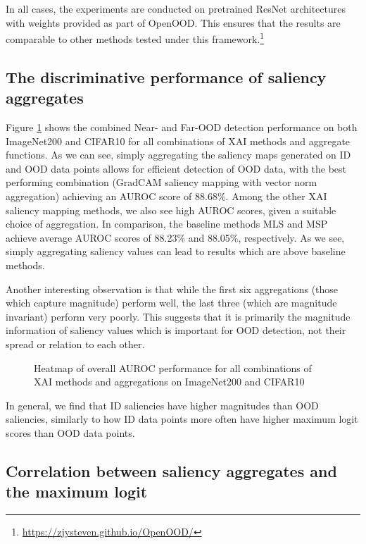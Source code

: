 \documentclass[runningheads]{llncs}
\begin{document}
In all cases, the experiments are conducted on pretrained ResNet architectures with weights provided as part of OpenOOD. This ensures that the results are comparable to other methods tested under this framework.\footnote{\url{https://zjysteven.github.io/OpenOOD/}}

\subsection{The discriminative performance of saliency aggregates}

Figure \ref{fig:both_heatmap} shows the combined Near- and Far-OOD detection performance on both ImageNet200 and CIFAR10 for all combinations of XAI methods and aggregate functions. As we can see, simply aggregating the saliency maps generated on ID and OOD data points allows for efficient detection of OOD data, with the best performing combination (GradCAM saliency mapping with vector norm aggregation) achieving an AUROC score of 88.68\%. Among the other XAI saliency mapping methods, we also see high AUROC scores, given a suitable choice of aggregation. In comparison, the baseline methods MLS and MSP achieve average AUROC scores of 88.23\% and 88.05\%, respectively. As we see, simply aggregating saliency values can lead to results which are above baseline methods.

Another interesting observation is that while the first six aggregations (those which capture magnitude) perform well, the last three (which are magnitude invariant) perform very poorly. This suggests that it is primarily the magnitude information of saliency values which is important for OOD detection, not their spread or relation to each other.

\begin{figure}[hbtp]
    \begin{center}
    \resizebox{0.8\textwidth}{!}{%
        
        }
    \end{center}
    \caption[Overall Performance on ImageNet200 and CIFAR10]{Heatmap of overall AUROC performance for all combinations of XAI methods and aggregations on ImageNet200 and CIFAR10}
    \label{fig:both_heatmap}
\end{figure}

In general, we find that ID saliencies have higher magnitudes than OOD saliencies, similarly to how ID data points more often have higher maximum logit scores than OOD data points.

\subsection{Correlation between saliency aggregates and the maximum logit}
\end{document}
